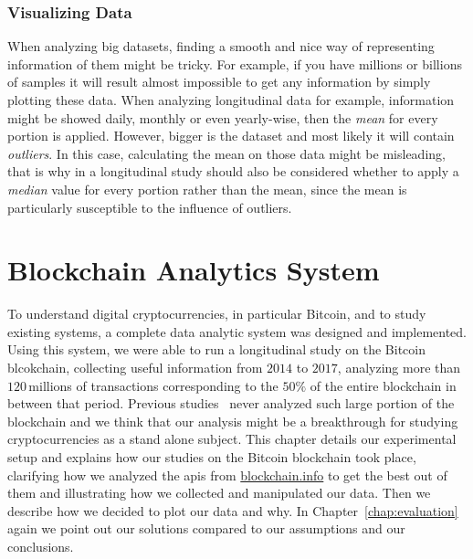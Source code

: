 \documentclass[USenglish]{uit-thesis}
\begin{document}
\subsection{Visualizing Data}
When analyzing big datasets, finding a smooth and nice way of
representing information of them might be tricky. For example, if
you have millions or billions of samples it will result
almost impossible to get any information by simply plotting these data.
When analyzing longitudinal data for example, information
might be showed daily, monthly or even yearly-wise, then the
\emph{mean} for every portion is applied. However, bigger
is the dataset and most likely it will contain \emph{outliers}.
In this case, calculating the mean on those data
might be misleading, that is why in a longitudinal study
should also be considered whether to apply a \emph{median} value
for every portion rather than the mean, since the mean is particularly
susceptible to the influence of outliers.


\chapter{Blockchain Analytics System}
\label{chap:expsetup}
To understand digital cryptocurrencies,
in particular Bitcoin, and to study existing systems,
a complete data analytic
system was designed and implemented. Using
this system, we were able to run a longitudinal study
on the Bitcoin blcokchain, collecting useful
information from $2014$ to $2017$, analyzing more
than $120$\,millions of transactions corresponding
to the $50\%$ of the entire blockchain in between that period.
Previous studies~\cite{Moser2015, Decker2013IPBN} never
analyzed such large portion of the blockchain
and we think that our analysis might be a breakthrough
for studying cryptocurrencies as a stand alone subject. 
This chapter details our experimental setup and
explains how our studies on the Bitcoin
blockchain took place, clarifying how
we analyzed the \gls{api}s from \url{blockchain.info} to get the
best out of them and illustrating how we collected and manipulated
our data. Then we describe how we decided to plot
our data and why. In Chapter~\ref{chap:evaluation} again
we point out our solutions compared to our
assumptions and our conclusions.
\end{document}
